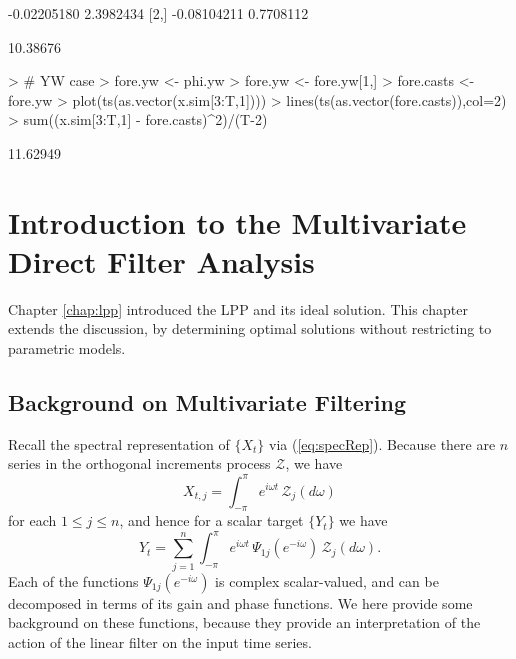 \documentclass[a4paper]{book}
\begin{document}
\begin{Schunk}
\begin{Soutput}
            [,1]      [,2]
[1,] -0.02205180 2.3982434
[2,] -0.08104211 0.7708112
\end{Soutput}
\begin{Soutput}
[1] 10.38676
\end{Soutput}
\begin{Sinput}
> # YW case
> fore.yw <- phi.yw %
> fore.yw <- fore.yw[1,]
> fore.casts <- fore.yw %
> plot(ts(as.vector(x.sim[3:T,1])))
> lines(ts(as.vector(fore.casts)),col=2)
> sum((x.sim[3:T,1] - fore.casts)^2)/(T-2)
\end{Sinput}
\begin{Soutput}
[1] 11.62949
\end{Soutput}
\end{Schunk}




\chapter{Introduction to the Multivariate Direct Filter Analysis}
\label{chap:basic}

Chapter \ref{chap:lpp} introduced the LPP and its ideal solution.  This chapter
 extends the discussion, by determining optimal solutions without restricting
 to parametric models.

\section{Background on Multivariate Filtering}

 Recall the spectral representation of $\{ X_t \}$ via (\ref{eq:specRep}).  Because 
 there are $n$ series in the orthogonal increments process $\mathcal{Z}$, we have
\[
  X_{t,j} = \int_{-\pi}^{\pi} e^{i \omega t} \, \mathcal{Z}_j (d\omega )
\] 
 for each $1 \leq j \leq n$, and hence for a scalar target $\{ Y_t \}$ we have
\begin{equation}
 \label{eq:spec-rep.partial}
  Y_t = \sum_{j=1}^n  \int_{-\pi}^{\pi} e^{i \omega  t} \, \Psi_{1 j} (e^{-i \omega }) \,
   \mathcal{Z}_j (d\omega ).
\end{equation}
  Each of the functions $\Psi_{1j} (e^{-i \omega })$ is complex scalar-valued, and
 can be decomposed in terms of its gain and phase functions.   We here provide some
 background on these functions, because they provide an interpretation of the action
 of the linear filter on the input time series.
\end{document}
